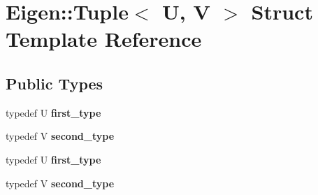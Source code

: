 \hypertarget{struct_eigen_1_1_tuple}{}\section{Eigen\+:\+:Tuple$<$ U, V $>$ Struct Template Reference}
\label{struct_eigen_1_1_tuple}
\subsection*{Public Types}
\begin{DoxyCompactItemize}
\item 
\mbox{\label{struct_eigen_1_1_tuple_adea01fdc8cd2dfdfa27b8bca00145c9e}} 
typedef U {\bfseries first\+\_\+type}
\item 
\mbox{\label{struct_eigen_1_1_tuple_a5c3f221d8b9cafecd718e5c093e62648}} 
typedef V {\bfseries second\+\_\+type}
\item 
\mbox{\label{struct_eigen_1_1_tuple_adea01fdc8cd2dfdfa27b8bca00145c9e}} 
typedef U {\bfseries first\+\_\+type}
\item 
\mbox{\label{struct_eigen_1_1_tuple_a5c3f221d8b9cafecd718e5c093e62648}} 
typedef V {\bfseries second\+\_\+type}
\end{DoxyCompactItemize}
